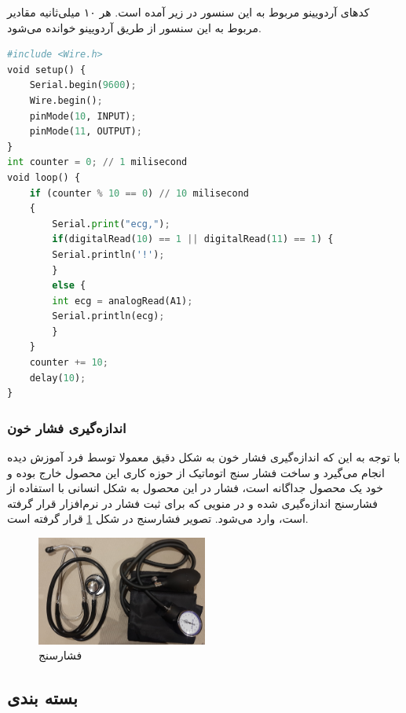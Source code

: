 کدهای آردویینو مربوط به این سنسور در زیر آمده است. هر ۱۰ میلی‌ثانیه مقادیر مربوط به این سنسور از طریق آردویینو خوانده می‌شود.

\begin{latin}
	\begin{lstlisting}[language=python]
#include <Wire.h>
void setup() {
	Serial.begin(9600);
	Wire.begin();
	pinMode(10, INPUT);
	pinMode(11, OUTPUT);
}
int counter = 0; // 1 milisecond
void loop() {
	if (counter % 10 == 0) // 10 milisecond
	{
		Serial.print("ecg,");
		if(digitalRead(10) == 1 || digitalRead(11) == 1) {
		Serial.println('!');
		}
		else {
		int ecg = analogRead(A1);
		Serial.println(ecg);
		}  
	}
	counter += 10;
	delay(10);
}

	\end{lstlisting}
\end{latin}





\subsubsection{انداز‌ه‌گیری فشار خون }

با توجه به این که اندازه‌گیری فشار خون به شکل دقیق معمولا توسط فرد آموزش دیده انجام می‌گیرد و ساخت فشار سنج اتوماتیک از حوزه کاری این محصول خارج بوده و خود یک محصول جداگانه است، فشار در این محصول به شکل انسانی با استفاده از فشارسنج اندازه‌گیری شده و در منویی که برای ثبت فشار در نرم‌افزار قرار گرفته است، وارد می‌شود. تصویر فشارسنج در شکل \ref{fig:12} قرار گرفته است.



\begin{figure}[h]
	\centering
	\includegraphics[width=0.5\textwidth]{figs/cuff.jpg}
	
	\caption{فشارسنج}
	\label{fig:12}
\end{figure}




\subsection{بسته بندی}

